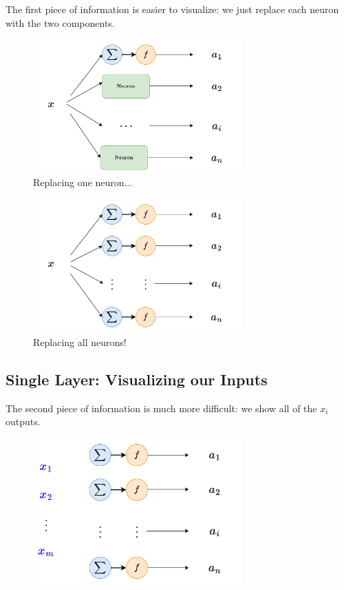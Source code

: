         The first piece of information is easier to visualize: we just replace each neuron with the two components.
        
        \begin{figure}[H]
            \centering
            \includegraphics[width=80mm,scale=0.4]{images/nn_images/replace_one_neuron.png}
            \caption*{Replacing one neuron...}
        \end{figure}
        
        \begin{figure}[H]
            \centering
            \includegraphics[width=80mm,scale=0.4]{images/nn_images/replace_all_neurons.png}
            \caption*{Replacing all neurons!}
        \end{figure}
    
    \subsection*{Single Layer: Visualizing our Inputs}
    
        The second piece of information is much more difficult: we show all of the $x_i$ outputs.
        
        \begin{figure}[H]
            \centering
            \includegraphics[width=80mm,scale=0.4]{images/nn_images/layers_with_input.png}
        \end{figure}
        
